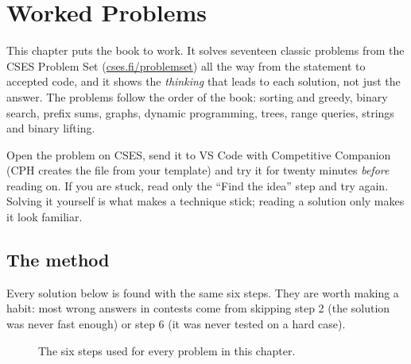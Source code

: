 \chapter{Worked Problems}\label{ch:worked}

This chapter puts the book to work. It solves seventeen classic problems from the CSES Problem Set
(\href{https://cses.fi/problemset/}{cses.fi/problemset}) all the way from the statement to accepted code, and it shows the
\emph{thinking} that leads to each solution, not just the answer. The problems follow the order of the book: sorting and
greedy, binary search, prefix sums, graphs, dynamic programming, trees, range queries, strings and binary lifting.

\begin{tip}
Open the problem on CSES, send it to VS Code with Competitive Companion (CPH creates the file from your template) and try it
for twenty minutes \emph{before} reading on. If you are stuck, read only the ``Find the idea'' step and try again. Solving it
yourself is what makes a technique stick; reading a solution only makes it look familiar.
\end{tip}

\section[The method]{The method \hfill \bronze}

Every solution below is found with the same six steps. They are worth making a habit: most wrong answers in contests come
from skipping step 2 (the solution was never fast enough) or step 6 (it was never tested on a hard case).

\begin{figure}[H]
\centering
{}
\caption{The six steps used for every problem in this chapter.}
\end{figure}

